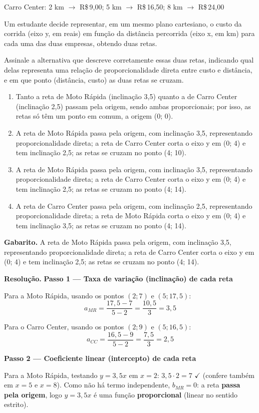 \documentclass[11pt,a4paper]{article}
\begin{document}
Carro Center: 2 km $\to$ R\$\,9,00; 5 km $\to$ R\$\,16,50; 8 km $\to$ R\$\,24,00

Um estudante decide representar, em um mesmo plano cartesiano, o custo da corrida (eixo y, em reais) em função da distância percorrida (eixo x, em km) para cada uma das duas empresas, obtendo duas retas.

Assinale a alternativa que descreve corretamente essas duas retas, indicando qual delas representa uma relação de proporcionalidade direta entre custo e distância, e em que ponto (distância, custo) as duas retas se cruzam.
\begin{enumerate}[label=(\alph*)]
\item Tanto a reta de Moto Rápida (inclinação 3,5) quanto a de Carro Center (inclinação 2,5) passam pela origem, sendo ambas proporcionais; por isso, as retas só têm um ponto em comum, a origem (0; 0).
\item A reta de Moto Rápida passa pela origem, com inclinação 3,5, representando proporcionalidade direta; a reta de Carro Center corta o eixo y em (0; 4) e tem inclinação 2,5; as retas se cruzam no ponto (4; 10).
\item A reta de Moto Rápida passa pela origem, com inclinação 3,5, representando proporcionalidade direta; a reta de Carro Center corta o eixo y em (0; 4) e tem inclinação 2,5; as retas se cruzam no ponto (4; 14).
\item A reta de Carro Center passa pela origem, com inclinação 2,5, representando proporcionalidade direta; a reta de Moto Rápida corta o eixo y em (0; 4) e tem inclinação 3,5; as retas se cruzam no ponto (4; 14).
\end{enumerate}

\textbf{Gabarito.} A reta de Moto Rápida passa pela origem, com inclinação 3,5, representando proporcionalidade direta; a reta de Carro Center corta o eixo y em (0; 4) e tem inclinação 2,5; as retas se cruzam no ponto (4; 14).

\textbf{Resolução.} \textbf{Passo 1 — Taxa de variação (inclinação) de cada reta}

Para a Moto Rápida, usando os pontos $(2;7)$ e $(5;17{,}5)$:
$$a_{MR}=\frac{17{,}5-7}{5-2}=\frac{10{,}5}{3}=3{,}5$$

Para o Carro Center, usando os pontos $(2;9)$ e $(5;16{,}5)$:
$$a_{CC}=\frac{16{,}5-9}{5-2}=\frac{7{,}5}{3}=2{,}5$$

\textbf{Passo 2 — Coeficiente linear (intercepto) de cada reta}

Para a Moto Rápida, testando $y=3{,}5x$ em $x=2$: $3{,}5\cdot 2 = 7$ $\checkmark$ (confere também em $x=5$ e $x=8$). Como não há termo independente, $b_{MR}=0$: a reta \textbf{passa pela origem}, logo $y=3{,}5x$ é uma função \textbf{proporcional} (linear no sentido estrito).
\end{document}
